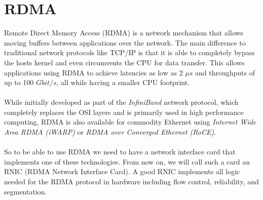 \section{RDMA} \label{sec:rdma}

Remote Direct Memory Access (RDMA) is a network mechanism that allows moving buffers between applications over the network.
The main difference to traditional network protocols like TCP/IP is that it is able to completely bypass the hosts kernel
and even circumvents the CPU for data transfer. This allows applications using RDMA to achieve latencies as low as 2 $\mu s$
and throughputs of up to 100 $Gbit/s$, all while having a smaller CPU footprint.


\paragraph{} While initially developed as part of the \emph{InfiniBand} network protocol, which completely replaces the OSI 
layers and is primarily used in high performance computing, RDMA is also available for commodity Ethernet using 
\emph{Internet Wide Area RDMA (iWARP)} or \emph{RDMA over Converged Ethernet (RoCE)}.


\paragraph{} So to be able to use RDMA we need to have a network interface card that implements one of these technologies. 
From now on, we will call such a card an RNIC (RDMA Network Interface Card). A good RNIC implements all logic needed for 
the RDMA protocol in hardware including flow control, reliability, and segmentation.


